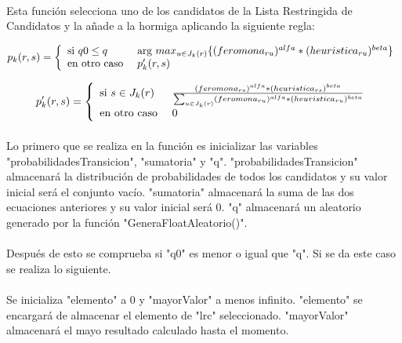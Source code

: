 	\newpage

	\paragraph{}Esta función selecciona uno de los candidatos de la Lista Restringida de Candidatos y la añade a la hormiga aplicando la siguiente regla:

	\begin{equation}
	p_{k}(r,s)= \left\lbrace
	\begin{array}{ll}
	\textup{si } q0 \leq q & \textup{arg }max_{u \in J_{k}(r)}\{(feromona_{ru})^{alfa}*(heuristica_{ru})^{beta}\}\\
	\textup{en otro caso } & p'_{k}(r,s)
	\end{array}
	\right.
	\end{equation}

	\begin{equation}
	p'_{k}(r,s)= \left\lbrace
	\begin{array}{ll}
	\textup{si } s \in J_{k}(r) & \frac{(feromona_{rs})^{alfa}*(heuristica_{rs})^{beta}}{\sum_{u \in J_{k}(r)}(feromona_{ru})^{alfa}*(heuristica_{ru})^{beta}}\\
	\textup{en otro caso } & 0
	\end{array}
	\right.
	\end{equation}
	
	\paragraph{}Lo primero que se realiza en la función es inicializar las variables "probabilidadesTransicion", "sumatoria" y "q". "probabilidadesTransicion" almacenará la distribución de probabilidades de todos los candidatos y su valor inicial será el conjunto vacío. "sumatoria" almacenará la suma de las dos ecuaciones anteriores y su valor inicial será 0. "q" almacenará un aleatorio generado por la función "GeneraFloatAleatorio()".
	
	\paragraph{}Después de esto se comprueba si "q0" es menor o igual que "q". Si se da este caso se realiza lo siguiente.
	
	\paragraph{}Se inicializa "elemento" a 0 y "mayorValor" a menos infinito. "elemento" se encargará de almacenar el elemento de "lrc" seleccionado. "mayorValor" almacenará el mayo resultado calculado hasta el momento.
	

